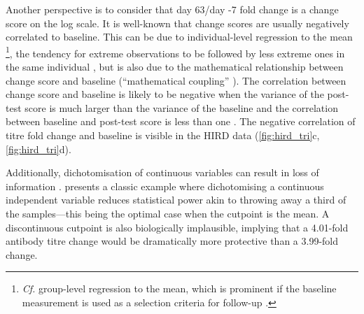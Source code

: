 Another perspective is to consider that day 63/day -7 fold change is a change score on the log scale.
It is well-known that change scores are usually negatively correlated to baseline.
This can be due to individual-level regression to the mean%
\footnote{
    \textit{Cf.} group-level regression to the mean, which is prominent if the baseline measurement is used as a selection criteria for follow-up \autocite{barnett2004RegressionMeanWhat,senn2011FrancisGaltonRegression}.
}, 
the tendency for extreme observations to be followed by less extreme ones in the same individual \autocite{barnett2004RegressionMeanWhat},
but is also due to the mathematical relationship between change score and baseline (\enquote{mathematical coupling} \autocite{tu2007RevisitingRelationChange}).
The correlation between change score and baseline is likely to be negative 
when the variance of the post-test score is much larger than the variance of the baseline 
and the correlation between baseline and post-test score is less than one \autocite{tu2007RevisitingRelationChange,clifton2019CorrelationBaselineScore}.
The negative correlation of titre fold change and baseline is visible in the \gls{HIRD} data (\cref{fig:hird_tri}c, \cref{fig:hird_tri}d).

Additionally, dichotomisation of continuous variables can result in loss of information \autocite{cohen1983CostDichotomization,senn2005DichotomaniaObsessiveCompulsive,altman2006CostDichotomisingContinuous,fedorov2009ConsequencesDichotomization}.
\textcite{cohen1983CostDichotomization} presents a classic example where 
dichotomising a continuous independent variable reduces statistical power akin to throwing away a third of the samples---this being the optimal case when the cutpoint is the mean.
A discontinuous cutpoint is also biologically implausible, implying that a 4.01-fold antibody titre change would be dramatically more protective than a 3.99-fold change.

